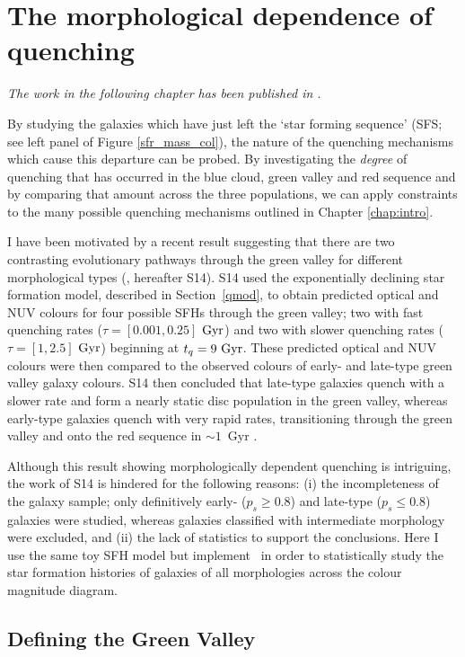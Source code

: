 \chapter{The morphological dependence of quenching}\label{chap:morph}

\emph{The work in the following chapter has been published in \citet{smethurst15}.}


By studying the galaxies which have just left the `star forming sequence' (SFS; see left panel of Figure \ref{sfr_mass_col}), the nature of the quenching mechanisms which cause this departure can be probed. By investigating the \emph{degree} of quenching that has occurred in the blue cloud, green valley and red sequence and by comparing that amount across the three populations, we can apply constraints to the many possible quenching mechanisms outlined in Chapter \ref{chap:intro}. 

I have been motivated by a recent result suggesting that there are two contrasting evolutionary pathways through the green valley for different morphological types (\citealt{schawinski14}, hereafter S14). S14 used the exponentially declining star formation model, described in Section~\ref{qmod}, to obtain predicted optical and NUV colours for four possible SFHs through the green valley; two with fast quenching rates ($\tau = [0.001, 0.25]$ $\rm{Gyr}$) and two with slower quenching rates ($\tau = [1, 2.5]$ $\rm{Gyr}$) beginning at $t_q = 9~\rm{Gyr}$. These predicted optical and NUV colours were then compared to the observed colours of early- and late-type green valley galaxy colours. S14 then concluded that late-type galaxies quench with a slower rate and form a nearly static disc population in the green valley, whereas early-type galaxies quench with very rapid rates, transitioning through the green valley and onto the red sequence in $\sim 1$~Gyr \citep{Wong12}. 

Although this result showing morphologically dependent quenching is intriguing, the work of S14 is hindered for the following reasons: (i) the incompleteness of the galaxy sample; only definitively early- ($p_s \geq 0.8$) and late-type ($p_s \leq 0.8$) galaxies were studied, whereas galaxies classified with intermediate morphology were excluded, and (ii) the lack of statistics to support the conclusions. Here I use the same toy SFH model but implement \starpy ~in order to statistically study the star formation histories of galaxies of all morphologies across the colour magnitude diagram.


\section{Defining the Green Valley}\label{defGV}

